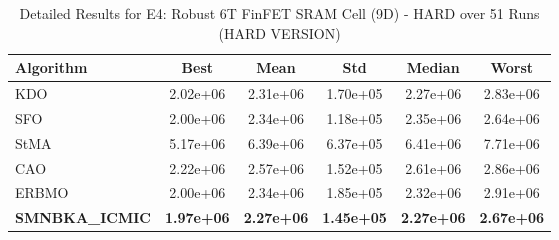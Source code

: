\begin{table}[htbp]
\centering
\caption{Detailed Results for E4: Robust 6T FinFET SRAM Cell (9D) - HARD over 51 Runs (HARD VERSION)}
\label{tab:P4_detailed}
\small
\begin{tabular}{lccccc}
\toprule
\textbf{Algorithm} & \textbf{Best} & \textbf{Mean} & \textbf{Std} & \textbf{Median} & \textbf{Worst} \\
\midrule
KDO & 2.02e+06 & 2.31e+06 & 1.70e+05 & 2.27e+06 & 2.83e+06 \\
SFO & 2.00e+06 & 2.34e+06 & 1.18e+05 & 2.35e+06 & 2.64e+06 \\
StMA & 5.17e+06 & 6.39e+06 & 6.37e+05 & 6.41e+06 & 7.71e+06 \\
CAO & 2.22e+06 & 2.57e+06 & 1.52e+05 & 2.61e+06 & 2.86e+06 \\
ERBMO & 2.00e+06 & 2.34e+06 & 1.85e+05 & 2.32e+06 & 2.91e+06 \\
\textbf{SMNBKA_ICMIC} & \textbf{1.97e+06} & \textbf{2.27e+06} & \textbf{1.45e+05} & \textbf{2.27e+06} & \textbf{2.67e+06} \\
\bottomrule
\end{tabular}
\end{table}
